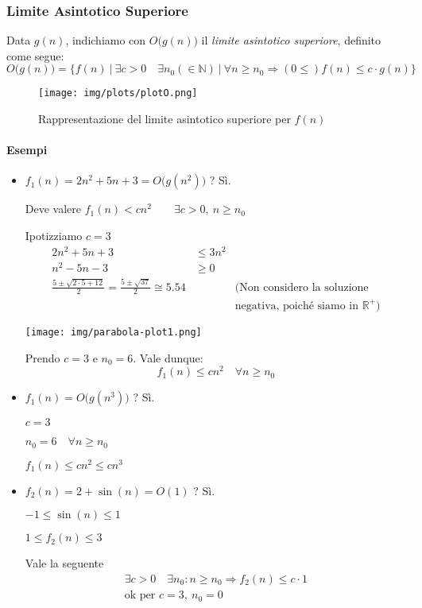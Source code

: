 \subsubsection{Limite Asintotico Superiore}
Data $g(n)$, indichiamo con $O \big(g(n) \big)$ il \emph{limite asintotico superiore}, definito come segue:
\begin{displaymath}
	O \big(g(n) \big) = \{ f(n) \ \vert \ \exists c > 0 \quad \exists n_0 (\in \mathbb{N}) \ \vert \ \forall n \geq n_0 \Rightarrow (0 \leq) f(n) \leq c \cdot g(n) \}
\end{displaymath}

\begin{figure}[!htb]
	\centering
	\texttt{[image: img/plots/plotO.png]}
	\caption{Rappresentazione del limite asintotico superiore per $f(n)$}
\end{figure}

\paragraph{Esempi}
\begin{itemize}
	\item $f_1(n) = 2n^2 + 5n + 3 = O \big(g(n^2) \big)$ ? Sì. \par
	Deve valere $f_1(n) < cn^2 \qquad \exists c > 0, \ n \geq n_0$ \par
	Ipotizziamo $c = 3$
	\begin{align*}
		2n^2 + 5n + 3 & \leq 3n^2 \\
		n^2 - 5n - 3 & \geq 0 \\
		\frac{5 \pm \sqrt{2 \cdot 5 + 12}}{2} = \frac{5 \pm \sqrt{37}}{2} \cong 5.54 && \text{(Non considero la soluzione} \\ && \text{negativa, poiché siamo in } \mathbb{R}^+ \text{)}
	\end{align*}
	\begin{center}
		\texttt{[image: img/parabola-plot1.png]}
	\end{center}
	
	Prendo $c = 3$ e $n_0 = 6$. Vale dunque:
	\begin{displaymath}
		f_1(n) \leq cn^2 \quad \forall n \geq n_0
	\end{displaymath}

	\item $f_1(n) = O \big(g(n^3) \big)$ ? Sì. \par
	$c = 3 $\par
	$n_0 = 6 \quad \forall n \geq n_0$ \par
	$f_1(n) \leq cn^2 \leq cn^3$
	
	\item $f_2(n) = 2 + \sin (n) = O(1)$ ? Sì. \par
	$-1 \leq \sin (n) \leq 1$ \par
	$1 \leq f_2(n) \leq 3$ \par
	Vale la seguente
	\begin{gather*}
		\exists c > 0 \quad \exists n_0 : n \geq n_0 \Rightarrow f_2(n) \leq c \cdot 1 \\
		\text{ok per } c = 3, \ n_0 = 0
	\end{gather*}
\end{itemize}

